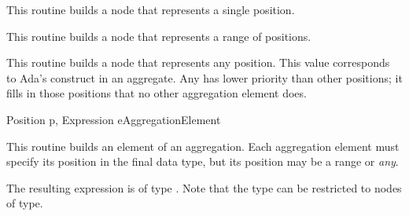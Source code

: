 \begin{functionality}
This routine builds a  node that represents a single
position.  
\end{functionality}
\begin{functionality}
This routine builds a  node that represents a range of
positions.  
\end{functionality}
\begin{functionality}
This routine builds a  node that represents any
position.  This value corresponds to Ada's  construct in
an aggregate.  Any has lower priority than other positions; it fills
in those positions that no other aggregation element does.
\end{functionality}

	{Position p, Expression e}{AggregationElement}
\begin{functionality}
This routine builds an element of an aggregation.  Each aggregation
element must specify its position in the final data type, but its
position may be a range or \emph{any}.
\end{functionality}

\begin{functionality}
  The resulting expression is
of type .  Note that the type can be restricted to nodes of
 type.  
\end{functionality}

\label{sec:assignOp}


